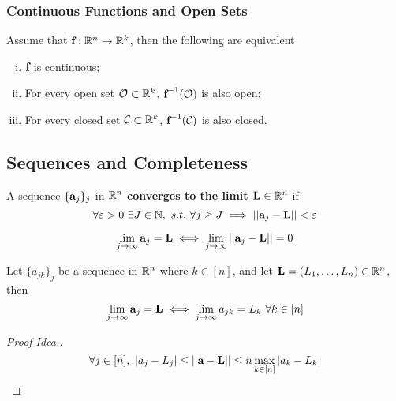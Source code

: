 \documentclass[11pt]{article}
\newcommand{\vea}[0]{\ve{a}}
\newcommand{\vef}[0]{\ve{f}}
\begin{document}
			\subsubsection{Continuous Functions and Open Sets}
				\begin{theorem}
					Assume that $\vef: \R^n \to \R^k$, then the following are equivalent
					\begin{enumerate}[(i)]
						\item $\vef$ is continuous;
						\item For every open set $\mathcal{{O}} \subset \mathbb{R}^k$, $\vef^{-1}(\mc{O})$ is also open;
						\item For every closed set $\mathcal{{C}} \subset \mathbb{R}^k$, $\vef^{-1}(\mc{C})$ is also closed.
					\end{enumerate}
				\end{theorem}
		\subsection{Sequences and Completeness}
			\begin{definition}
		    	    A sequence $\{\vea_j\}_j$ in $\mathbb{R}^n$ \textbf{converges to the limit $\textbf{L} \in \mathbb{R}^n$} if 
		    	    \begin{equation}
		    	    	\forall \varepsilon > 0\ \exists J \in \N,\ s.t.\ \forall j \geq J \implies \norm{\vea_j - \ve{L}} < \varepsilon
		    	    \end{equation}
		    \end{definition}
		    
		    \begin{theorem}
		    		\begin{equation}
		    			\lim_{j \to \infty} \vea _j = \ve{L} \iff \lim_{j \to \infty} \norm{\vea_j - \ve{L}} = 0
		    		\end{equation}
		    \end{theorem}
		    
		    \begin{theorem}
		    		Let $\{a_{jk}\}_j$ be a sequence in $\mathbb{R}^n$ where $k \in [n]$, and let $\textbf{L} = (L_1, \dots, L_n) \in \mathbb{R}^n$, then
		    		\begin{equation}
		    			\lim_{j \to \infty} \vea _j = \ve{L} \iff \lim_{j \to \infty} a_{jk} = L_k\ \forall k \in [n]
		    		\end{equation}
		    		\begin{proof}[Proof Idea.]
		    			\begin{equation}
		    				\forall j \in [n],\ |a_j - L_j| \leq \norm{\vea - \ve{L}} \leq n \max_{k \in [n]} |a_k - L_k|
		    			\end{equation}
		    		\end{proof}
		    \end{theorem}
		    
\end{document}
